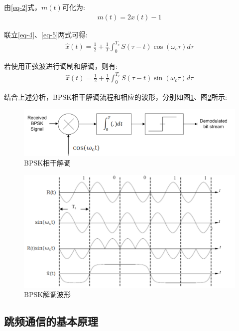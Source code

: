 \documentclass[12pt]{ctexart}
\begin{document}
	由\eqref{eq-2}式，$m(t)$可化为:
\begin{align}
	m(t) = 2x(t) - 1
	\label{eq-5}
\end{align}

	联立\eqref{eq-4}、\eqref{eq-5}两式可得:
\begin{align}
	\hat x(t) = 
	\frac{1}{2} + 
	\frac{1}{T} \int_0^{T_c} S(\tau − t) \cos(\omega_c \tau) d\tau
	\label{eq-6}
\end{align}

	若使用正弦波进行调制和解调，则有:
\begin{align}
	\hat x(t) = 
	\frac{1}{2} + 
	\frac{1}{T} \int_0^{T_c} S(\tau − t) \sin(\omega_c \tau) d\tau
	\label{eq-7}
\end{align}

	结合上述分析，BPSK相干解调流程和相应的波形，分别如图\ref{dmod-prin}、图\ref{dmod-exp}所示:
\begin{figure}[htbp]
	\centering
 	\includegraphics[scale=0.65]{../figures/dmod-prin.png}
	\caption{BPSK相干解调}
	\label{dmod-prin}
\end{figure}


\begin{figure}[htbp]
	\centering
 	\includegraphics[scale=0.6]{../figures/dmod-exp.png}
	\caption{BPSK解调波形}
	\label{dmod-exp}
\end{figure}


\subsection{跳频通信的基本原理}
\end{document}
